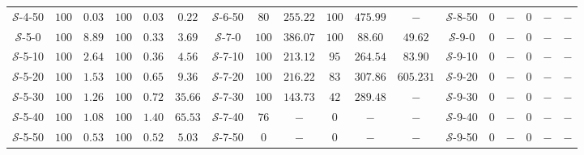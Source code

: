 \begin{table}[]
{\begin{tabular}{cccccc|cccccc|cccccc}
            $\mathcal{S}$-4-50 & $100$ & $0.03$ & $100$ & $0.03$ & $0.22$ &
            $\mathcal{S}$-6-50 & $80$ & $255.22$ & $100$ & $475.99$ & $-$ &
            $\mathcal{S}$-8-50 & $0$ & $-$ & $0$ & $-$ & $-$ \\

            $\mathcal{S}$-5-0 & $100$ & $8.89$ & $100$ & $0.33$ & $3.69$ &
            $\mathcal{S}$-7-0 & $100$ & $386.07$ & $100$ & $88.60$ & $49.62$ &
            $\mathcal{S}$-9-0 & $0$ & $-$ & $0$ & $-$ & $-$ \\
            
            $\mathcal{S}$-5-10 & $100$ & $2.64$ & $100$ & $0.36$ & $4.56$ &
            $\mathcal{S}$-7-10 & $100$ & $213.12$ & $95$ & $264.54$ & $83.90$ &
            $\mathcal{S}$-9-10 & $0$ & $-$ & $0$ & $-$ & $-$ \\

            $\mathcal{S}$-5-20 & $100$ & $1.53$ & $100$ & $0.65$ & $9.36$ &
            $\mathcal{S}$-7-20 & $100$ & $216.22$ & $83$ & $307.86$ & $605.231$ &
            $\mathcal{S}$-9-20 & $0$ & $-$ & $0$ & $-$ & $-$ \\

            $\mathcal{S}$-5-30 & $100$ & $1.26$ & $100$ & $0.72$ & $35.66$ &
            $\mathcal{S}$-7-30 & $100$ & $143.73$ & $42$ & $289.48$ & $-$ &
            $\mathcal{S}$-9-30 & $0$ & $-$ & $0$ & $-$ & $-$ \\

            $\mathcal{S}$-5-40 & $100$ & $1.08$ & $100$ & $1.40$ & $65.53$ &
            $\mathcal{S}$-7-40 & $76$ & $-$ & $0$ & $-$ & $-$ &
            $\mathcal{S}$-9-40 & $0$ & $-$ & $0$ & $-$ & $-$ \\

            $\mathcal{S}$-5-50 & $100$ & $0.53$ & $100$ & $0.52$ & $5.03$ &
            $\mathcal{S}$-7-50 & $0$ & $-$ & $0$ & $-$ & $-$ &
            $\mathcal{S}$-9-50 & $0$ & $-$ & $0$ & $-$ & $-$ \\
            
            \hline
        \end{tabular}
    }
\end{table}

